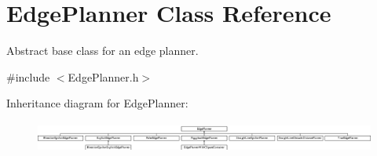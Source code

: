 \section{Edge\+Planner Class Reference}
\label{classEdgePlanner}


Abstract base class for an edge planner.  




{\ttfamily \#include $<$Edge\+Planner.\+h$>$}

Inheritance diagram for Edge\+Planner\+:\begin{figure}[H]
\begin{center}
\leavevmode
\includegraphics[height=1.043478cm]{classEdgePlanner}
\end{center}
\end{figure}
